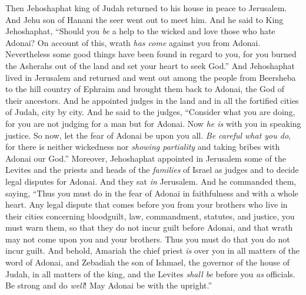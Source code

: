 \begin{biblechapter} %
 Then Jehoshaphat king of Judah returned to his house in peace to Jerusalem.
\verse And Jehu son of Hanani the seer went out to meet him. And he said to King Jehoshaphat, “Should you \textit{be} a help to the wicked and love those who hate Adonai? On account of this, wrath \textit{has come} against you from Adonai.
\verse Nevertheless some good things have been found in regard to you, for you burned the Asherahs out of the land and set your heart to seek God.”
\verse And Jehoshaphat lived in Jerusalem and returned and went out among the people from Beersheba to the hill country of Ephraim and brought them back to Adonai, the God of their ancestors.
\verse And he appointed judges in the land and in all the fortified cities of Judah, city by city.
\verse And he said to the judges, “Consider what you are doing, for you are not judging for a man but for Adonai. Now \textit{he is} with you in speaking justice.
\verse So now, let the fear of Adonai be upon you all. \textit{Be careful what you do}, for there is neither wickedness nor \textit{showing partiality} and taking bribes with Adonai our God.”
\verse Moreover, Jehoshaphat appointed in Jerusalem some of the Levites and the priests and heads of the \textit{families} of Israel as judges and to decide legal disputes for Adonai. And they sat \textit{in} Jerusalem.
\verse And he commanded them, saying, “Thus you must do in the fear of Adonai in faithfulness and with a whole heart.
\verse Any legal dispute that comes before you from your brothers who live in their cities concerning bloodguilt, law, commandment, statutes, and justice, you must warn them, so that they do not incur guilt before Adonai, and that wrath may not come upon you and your brothers. Thus you must do that you do not incur guilt.
\verse And behold, Amariah the chief priest \textit{is} over you in all matters of the word of Adonai, and Zebadiah the son of Ishmael, the governor of the house of Judah, in all matters of the king, and the Levites \textit{shall be} before you \textit{as} officials. Be strong and do \textit{well}! May Adonai be with the upright.”
\end{biblechapter}

